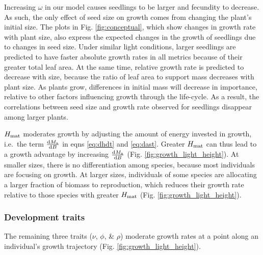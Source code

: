 \documentclass[a4paper,11pt]{article}
\begin{document}
Increasing $\omega$ in our model causes seedlings to be larger and fecundity to decrease. As such, the only effect of seed size on growth comes from changing the plant's initial  size. The plots in Fig. \ref{fig:conceptual}, which show changes in growth rate with plant size, also express the expected changes in the growth of seedlings due to changes in seed size. Under similar light conditions, larger seedlings are predicted to have faster absolute growth rates in all metrics  because of their greater total leaf area. At the same time, relative growth rate is predicted to decrease with size, because the ratio of leaf area to support mass decreases with plant size. As plants grow, differences in initial mass will decrease in importance, relative to other factors influencing growth through the life-cycle. As a result, the correlations between seed size and growth rate observed for seedlings disappear among larger plants.

$H_{{\rm mat}}$ moderates growth by adjusting the amount of energy invested in growth, i.e.~the term $\frac{{\rm d}M_{\rm a}}{{\rm d}B}$ in eqns \ref{eq:dhdt} and \ref{eq:dast}. Greater $H_{{\rm mat}}$ can thus lead to a growth advantage by increasing $\frac{{\rm d}M_{\rm a}}{{\rm d}B}$ (Fig. \ref{fig:growth_light_height}). At smaller sizes, there is no differentiation among species, because most individuals are focusing on growth. At larger sizes, individuals of some species are allocating a larger fraction of biomass to reproduction, which reduces their growth rate relative to those species with greater $H_{{\rm mat}}$ (Fig. \ref{fig:growth_light_height}).

\subsubsection{Development traits}

The remaining three traits ($\nu$, $\phi$, \& $\rho$) moderate growth rates at a point along an individual's growth trajectory (Fig. \ref{fig:growth_light_height}).
\end{document}
